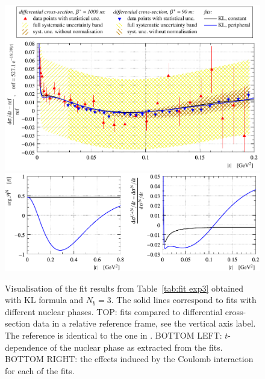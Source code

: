 \begin{figure}
\begin{center}
\includegraphics{fig/fit_exp3/t_dist_rel_with_fit.pdf}
\includegraphics{fig/fit_exp3/phase_cni_effect.pdf}
\caption{Visualisation of the fit results from Table~\ref{tab:fit exp3} obtained with KL formula and $N_b=3$. The solid lines correspond to fits with different nuclear phases.
TOP: fits compared to differential cross-section data in a relative reference frame, see the vertical axis label. The reference is identical to the one in \cite{8tev-90m}. 
BOTTOM LEFT: $t$-dependence of the nuclear phase as extracted from the fits.
BOTTOM RIGHT: the effects induced by the Coulomb interaction for each of the fits.
}%
\label{fig:fit exp3}
\end{center}
\end{figure}


